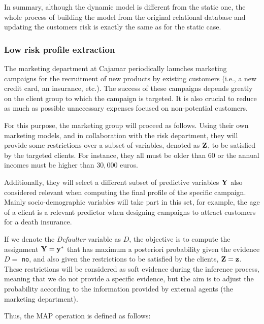 In summary, although the dynamic model is different from the static one, the whole process of building the model from the original relational database and updating the customers risk is exactly the same as for the static case.

\subsubsection{Low risk profile extraction} \label{subsubsec:profileExtraction}

The marketing department at Cajamar periodically launches marketing campaigns for the recruitment of new products by existing customers (i.e., a new credit card, an insurance, etc.). The success of these campaigns depends greatly on the client group to which the campaign is targeted. It is also crucial to reduce as much as possible unnecessary expenses focused on non-potential customers. 

For this purpose, the marketing group will proceed as follows. Using their own marketing models, and in collaboration with the risk department, they will provide some restrictions over a subset of variables, denoted as $\mathbf{Z}$, to be satisfied by the targeted clients. For instance, they all must be older than 60 or the annual incomes must be higher than $30,000$ euros. 

Additionally, they will select a different subset of predictive variables $\mathbf{Y}$ also considered relevant when computing the final profile of the specific campaign. Mainly  socio-demographic variables will take part in this set, for example, the age of a client is a relevant predictor when designing campaigns to attract customers for a death insurance. 

If we denote the \emph{Defaulter} variable as $D$,  the objective is to compute the assignment $\mathbf{Y} = \mathbf{y}^{*}$ that has maximum a posteriori probability given the evidence $D=$ \texttt{no}, and also given the restrictions to be satisfied by the clients, $\mathbf{Z}=\mathbf{z}$. These restrictions will be considered as soft evidence during the inference process, meaning that we do not provide a specific evidence, but the aim is to adjust the probability according to the information provided by external agents (the marketing department). 
 
Thus, the MAP operation is defined as follows:

